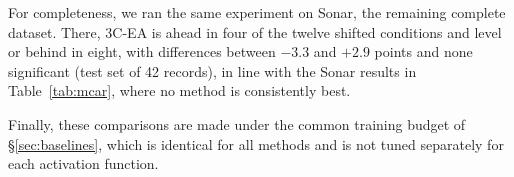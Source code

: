For completeness, we ran the same experiment on Sonar, the remaining complete dataset. There, 3C-EA is ahead in four of
the twelve shifted conditions and level or behind in eight, with differences between $-3.3$ and $+2.9$ points and none
significant
(test set of 42 records), in line with the Sonar results in Table~\ref{tab:mcar}, where no method is consistently
best.

Finally, these comparisons are made under the common training budget of \S\ref{sec:baselines}, which is identical for
all methods and is not tuned separately for each activation function.
